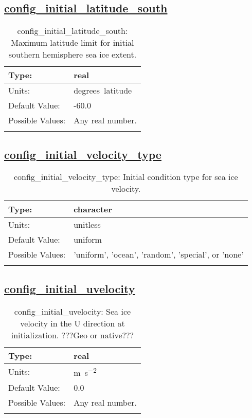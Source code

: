 \subsection[config\_initial\_latitude\_south]{\hyperref[sec:nm_tab_initialize]{config\_initial\_latitude\_south}}
\label{subsec:nm_sec_config_initial_latitude_south}
\begin{center}
\begin{longtable}{| p{2.0in} || p{4.0in} |}
    \hline
    Type: & real \\
    \hline
    Units: & \si{degrees.latitude} \\
    \hline
    Default Value: & -60.0 \\
    \hline
    Possible Values: & Any real number. \\
    \hline
    \caption{config\_initial\_latitude\_south: Maximum latitude limit for initial southern hemisphere sea ice extent.}
\end{longtable}
\end{center}
\subsection[config\_initial\_velocity\_type]{\hyperref[sec:nm_tab_initialize]{config\_initial\_velocity\_type}}
\label{subsec:nm_sec_config_initial_velocity_type}
\begin{center}
\begin{longtable}{| p{2.0in} || p{4.0in} |}
    \hline
    Type: & character \\
    \hline
    Units: & \si{unitless} \\
    \hline
    Default Value: & uniform \\
    \hline
    Possible Values: & 'uniform', 'ocean', 'random', 'special', or 'none' \\
    \hline
    \caption{config\_initial\_velocity\_type: Initial condition type for sea ice velocity.}
\end{longtable}
\end{center}
\subsection[config\_initial\_uvelocity]{\hyperref[sec:nm_tab_initialize]{config\_initial\_uvelocity}}
\label{subsec:nm_sec_config_initial_uvelocity}
\begin{center}
\begin{longtable}{| p{2.0in} || p{4.0in} |}
    \hline
    Type: & real \\
    \hline
    Units: & \si{m.s^{-2}} \\
    \hline
    Default Value: & 0.0 \\
    \hline
    Possible Values: & Any real number. \\
    \hline
    \caption{config\_initial\_uvelocity: Sea ice velocity in the U direction at initialization. ???Geo or native???}
\end{longtable}
\end{center}
